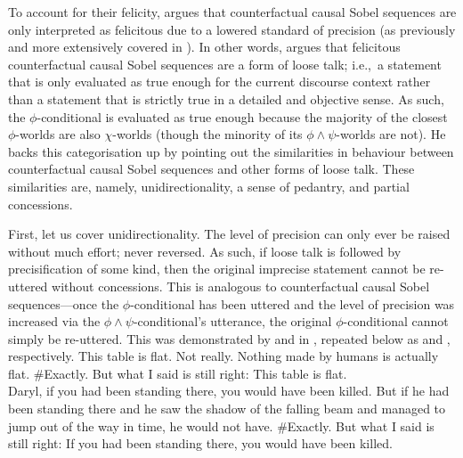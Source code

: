 \noindent To account for their felicity, \textcite{Klecha2014} argues that counterfactual causal Sobel sequences are only interpreted as felicitous due to a lowered standard of precision (as previously and more extensively covered in ). In other words, \textcite{Klecha2014} argues that felicitous counterfactual causal Sobel sequences are a form of loose talk; i.e.,~a statement that is only evaluated as true enough for the current discourse context rather than a statement that is strictly true in a detailed and objective sense. As such, the $\phi$-conditional is evaluated as true enough because the majority of the closest $\phi$-worlds are also $\chi$-worlds (though the minority of its $\phi\land\psi$-worlds are not). He backs this categorisation up by pointing out the similarities in behaviour between counterfactual causal Sobel sequences and other forms of loose talk. These similarities are, namely, unidirectionality, a sense of pedantry, and partial concessions.

First, let us cover unidirectionality. The level of precision can only ever be raised without much effort; never reversed. As such, if loose talk is followed by precisification of some kind, then the original imprecise statement cannot be re-uttered without concessions. This is analogous to counterfactual causal Sobel sequences---once the $\phi$-conditional has been uttered and the level of precision was increased via the $\phi\land\psi$-conditional's utterance, the original $\phi$-conditional cannot simply be re-uttered. This was demonstrated by  and  in , repeated below as  and , respectively.
\pex{}
\a{}This table is flat.
\a{}Not really. Nothing made by humans is actually flat.
\a{}\#Exactly. But what I said is still right: This table is flat.\\
\emptyfill\parencite[adapted from][p.~113]{Klecha2014}
\xe
\pex{}
			\a	{}Daryl, if you had been standing there, you would have been killed.
			\a	{}But if he had been standing there and he saw the shadow of the falling beam and managed to jump out of the way in time, he would not have.
			\a	{}\#Exactly. But what I said is still right:  If you had been
standing there, you would have been killed.\hfill\parencite[adapted from][p.~153f]{Klecha2014}
\xe

